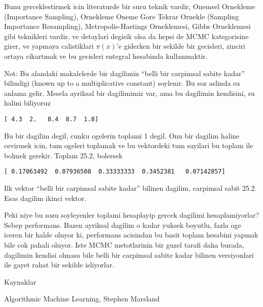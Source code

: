 \documentclass[12pt,fleqn]{article}
\begin{document}
Bunu gerceklestirmek icin literaturde bir suru teknik vardir, Onemsel
Ornekleme (Importance Sampling), Ornekleme Oneme Gore Tekrar Ornekle
(Sampling Importance Resampling), Metropolis-Hastings Orneklemesi, Gibbs
Orneklemesi gibi teknikleri vardir, ve detaylari degisik olsa da hepsi de
MCMC kategorisine girer, ve yapmaya calistiklari $\pi(x)$'e giderken bir
sekilde bir gecisleri, zinciri ortaya cikartmak ve bu gecisleri entegral
hesabinda kullanmaktir. 

Not: Bu alandaki makalelerde bir dagilimin ``belli bir carpimsal sabite
kadar'' bilindigi (known up to a multiplicative constant) soylenir. Bu soz
aslinda su anlama gelir. Mesela ayriksal bir dagilimimiz var, ama bu
dagilimin kendisini, su halini biliyoruz

\verb![ 4.3  2.   8.4  8.7  1.8]!

Bu bir dagilim degil, cunku ogelerin toplami 1 degil. Onu bir dagilim
haline cevirmek icin, tum ogeleri toplamak ve bu vektordeki tum sayilari bu
toplam ile bolmek gerekir. Toplam 25.2, bolersek

\verb![ 0.17063492  0.07936508  0.33333333  0.3452381   0.07142857]!

Ilk vektor ``belli bir carpimsal sabite kadar'' bilinen dagilim, carpimsal
sabit 25.2. Esas dagilim ikinci vektor. 

Peki niye bu sozu soyleyenler toplami hesaplayip gercek dagilimi
hesaplamiyorlar? Sebep performans. Bazen ayriksal dagilim o kadar yuksek
boyutlu, fazla oge iceren bir halde oluyor ki, performans acisindan bu
basit toplam hesabini yapmak bile cok pahali oluyor. Iste MCMC metotlarinin
bir guzel tarafi daha burada, dagilimin kendisi olmasa bile belli bir
carpimsal sabite kadar bilinen versiyonlari ile gayet rahat bir sekilde
isliyorlar.

Kaynaklar

Algorithmic Machine Learning, Stephen Marsland
\end{document}
